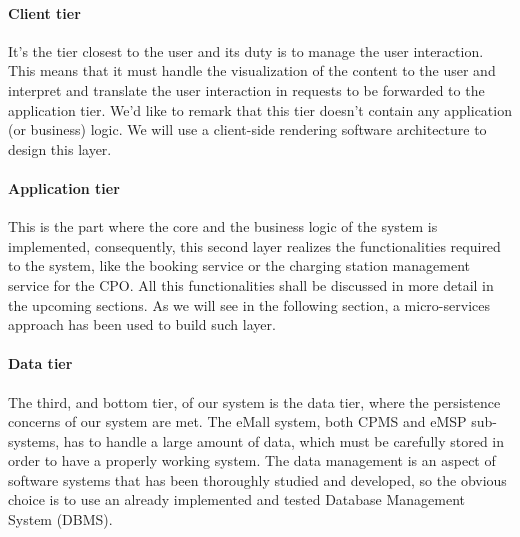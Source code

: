 \paragraph{Client tier} It's the tier closest to the user and its duty is to manage the user interaction. This means that it must handle the visualization of the content to the user and interpret and translate the user interaction in requests to be forwarded to the application tier. We'd like to remark that this tier doesn't contain any application (or business) logic. We will use a client-side rendering software architecture to design this layer.

\paragraph{Application tier} This is the part where the core and the business logic of the system is implemented, consequently, this second layer realizes the functionalities required to the system, like the booking service or the charging station management service for the CPO. All this functionalities shall be discussed in more detail in the upcoming sections. As we will see in the following section, a micro-services approach has been used to build such layer.

\paragraph{Data tier} The third, and bottom tier, of our system is the data tier, where the persistence concerns of our system are met. The eMall system, both CPMS and eMSP sub-systems, has to handle a large amount of data, which must be carefully stored in order to have a properly working system. The data management is an aspect of software systems that has been thoroughly studied and developed, so the obvious choice is to use an already implemented and tested Database Management System (DBMS).

